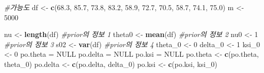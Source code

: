 \documentclass[
]{article}
\newenvironment{Shaded}{\begin{snugshade}}{\end{snugshade}}
\newcommand{\CommentTok}[1]{\textcolor[rgb]{0.56,0.35,0.01}{\textit{#1}}}
\newcommand{\ConstantTok}[1]{\textcolor[rgb]{0.56,0.35,0.01}{#1}}
\newcommand{\DecValTok}[1]{\textcolor[rgb]{0.00,0.00,0.81}{#1}}
\newcommand{\FloatTok}[1]{\textcolor[rgb]{0.00,0.00,0.81}{#1}}
\newcommand{\FunctionTok}[1]{\textcolor[rgb]{0.13,0.29,0.53}{\textbf{#1}}}
\newcommand{\NormalTok}[1]{#1}
\newcommand{\OtherTok}[1]{\textcolor[rgb]{0.56,0.35,0.01}{#1}}
\begin{document}
\begin{Shaded}
\begin{Highlighting}[]
\CommentTok{\#가능도}
\NormalTok{df }\OtherTok{\textless{}{-}} \FunctionTok{c}\NormalTok{(}\FloatTok{68.3}\NormalTok{, }\FloatTok{85.7}\NormalTok{, }\FloatTok{73.8}\NormalTok{, }\FloatTok{83.2}\NormalTok{, }\FloatTok{58.9}\NormalTok{, }\FloatTok{72.7}\NormalTok{, }\FloatTok{70.5}\NormalTok{, }\FloatTok{58.7}\NormalTok{, }\FloatTok{74.1}\NormalTok{, }\FloatTok{75.0}\NormalTok{)}
\NormalTok{m }\OtherTok{\textless{}{-}} \DecValTok{5000}

\NormalTok{nu }\OtherTok{\textless{}{-}} \FunctionTok{length}\NormalTok{(df) }\CommentTok{\#prior의 정보 1}
\NormalTok{theta0 }\OtherTok{\textless{}{-}} \FunctionTok{mean}\NormalTok{(df) }\CommentTok{\#prior의 정보 2}
\NormalTok{nu0 }\OtherTok{\textless{}{-}} \DecValTok{1} \CommentTok{\#prior의 정보 3}
\NormalTok{s02 }\OtherTok{\textless{}{-}} \FunctionTok{var}\NormalTok{(df) }\CommentTok{\#prior의 정보 4}
\NormalTok{theta\_0 }\OtherTok{\textless{}{-}} \DecValTok{0}
\NormalTok{delta\_0 }\OtherTok{\textless{}{-}} \DecValTok{1}
\NormalTok{ksi\_0 }\OtherTok{\textless{}{-}} \DecValTok{0}
\NormalTok{po.theta }\OtherTok{=} \ConstantTok{NULL}
\NormalTok{po.delta }\OtherTok{=} \ConstantTok{NULL}
\NormalTok{po.ksi }\OtherTok{=} \ConstantTok{NULL}
\NormalTok{po.theta }\OtherTok{\textless{}{-}} \FunctionTok{c}\NormalTok{(po.theta, theta\_0)}
\NormalTok{po.delta }\OtherTok{\textless{}{-}} \FunctionTok{c}\NormalTok{(po.delta, delta\_0)}
\NormalTok{po.ksi }\OtherTok{\textless{}{-}} \FunctionTok{c}\NormalTok{(po.ksi, ksi\_0)}


\end{Highlighting}
\end{Shaded}
\end{document}
